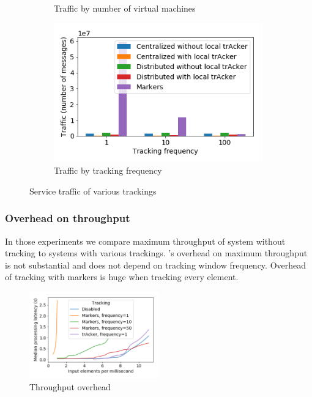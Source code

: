 \begin{figure}[t!]
\begin{subfigure}[b]{0.32\textwidth}
            \caption{Traffic by number of virtual machines}
    \end{subfigure}
    \hspace{5mm}
    \begin{subfigure}[b]{0.32\textwidth}
            \includegraphics[width=0.99\textwidth]{pics/traffic_by_tracking_frequency_bars.png}
            \caption{Traffic by tracking frequency}
	\end{subfigure}
    \caption{Service traffic of various trackings}
\end{figure}

\subsubsection{Overhead on throughput} \label{overhead}

In those experiments we compare maximum throughput of system without tracking to systems with various trackings. \tracker's overhead on maximum throughput is not substantial and does not depend on tracking window frequency. Overhead of tracking with markers is huge when tracking every element.

\begin{figure}[htbp]
  \centering
  \includegraphics[width=0.50\textwidth]{pics/throughput_overhead_50.png}
  \caption{Throughput overhead}
\end{figure}

